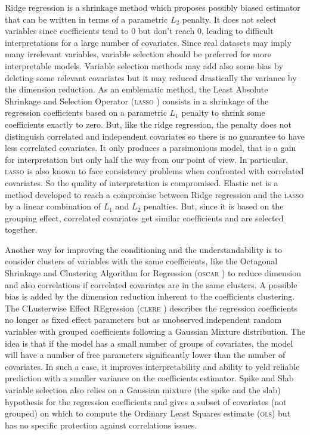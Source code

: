 \documentclass[11pt,a4paper]{article}
\begin{document}
Ridge regression \cite{marquardt1975ridge} is a shrinkage method which proposes possibly biased estimator that can be written in terms of a parametric $L_2$ penalty. It does not select variables since coefficients tend to 0 but don't reach 0, leading to difficult interpretations for a large number of covariates.	Since real datasets may imply many irrelevant variables, variable selection should be preferred for more interpretable models. Variable selection methods may add also some bias by deleting some relevant covariates but it may reduced drastically the variance by the dimension reduction.
As an emblematic method, the Least Absolute Shrinkage and Selection Operator (\textsc{lasso} \cite{tibshirani1996regression}) consists in a shrinkage of the regression coefficients based on a parametric $L_1$ penalty to shrink some coefficients exactly to zero. But, like the ridge regression, the penalty does not distinguish correlated and independent covariates so there is no guarantee to have less correlated covariates. It only produces a parsimonious model, that is a gain for interpretation but only half the way from our point of view. In particular, \textsc{lasso} is also known to face consistency problems \cite{Zhao2006MSC} when confronted with correlated covariates. So the quality of interpretation is compromised. Elastic net \cite{zou2005regularization} is a method developed to reach a compromise between Ridge regression and the \textsc{lasso} by a linear combination of $L_1$ and $L_2$ penalties. But, since it is based on the grouping effect, correlated covariates get similar coefficients and are selected together.

Another way for improving the conditioning and the understandability is to consider clusters of variables with the same coefficients, like the Octagonal Shrinkage and Clustering Algorithm for Regression (\textsc{oscar} \cite{bondell2008simultaneous}) to reduce dimension and also correlations if correlated covariates are in the same clusters. A possible bias is added by the dimension reduction inherent to the coefficients clustering.
The CLusterwise Effect REgression (\textsc{clere} \cite{yengo2012variable}) describes the regression coefficients no longer as fixed effect parameters but as unobserved independent random variables with grouped coefficients following a Gaussian Mixture distribution. The idea is that if the model has a small number of groups of covariates, the model will have a number of free parameters significantly lower than the number of covariates. In such a case, it improves interpretability and ability to yeld reliable prediction with a smaller variance on the coefficients estimator. 
Spike and Slab variable selection \cite{ishwaran2005spike} also relies on a Gaussian mixture (the spike and the slab) hypothesis for the regression coefficients and gives a subset of covariates (not grouped) on which to compute the Ordinary Least Squares estimate (\textsc{ols}) but has no specific protection against correlations issues.
\end{document}
